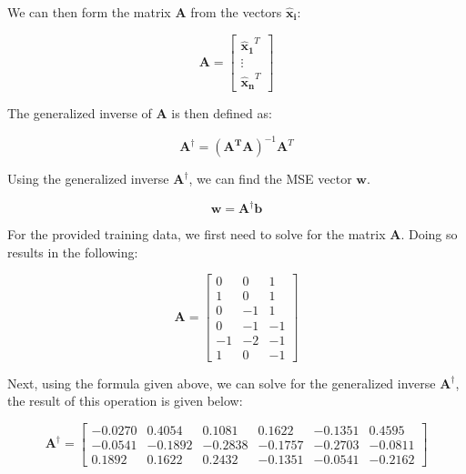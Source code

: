 \documentclass[fleqn]{article}
\begin{document}
\begin{enumerate}
		We can then form the matrix $\mathbf{A}$ from the vectors $\mathbf{\hat{x}_i}$:
		
		\begin{equation*}
			\mathbf{A} = \begin{bmatrix} \mathbf{\hat{x}_1}^T \\ \vdots \\ \mathbf{\hat{x}_n}^T \end{bmatrix}					
		\end{equation*}
		
		The generalized inverse of $\mathbf{A}$ is then defined as:
		
		\begin{equation*}
			\mathbf{A}^{\dag} = (\mathbf{A^T}\mathbf{A})^{-1}\mathbf{A}^T
		\end{equation*}
		
		Using the generalized inverse $\mathbf{A}^{\dag}$, we can find the MSE vector $\mathbf{w}$.
		
		\begin{equation*}
			\mathbf{w} = \mathbf{A}^{\dag}\mathbf{b}
		\end{equation*}
			
		For the provided training data, we first need to solve for the matrix $\mathbf{A}$. Doing so results in the following:
		
		\begin{equation*}
			\mathbf{A} = \begin{bmatrix}
				0  &  0 &  1 \\
				1  &  0 &  1 \\
				0  & -1 &  1 \\
				0  & -1 & -1 \\
			   -1  & -2 & -1 \\
			    1  &  0 & -1
			\end{bmatrix}
		\end{equation*}
		
		Next, using the formula given above, we can solve for the generalized inverse $\mathbf{A}^{\dag}$, the result of this operation is given below:
		
		\begin{equation*}
			\mathbf{A}^{\dag} = \begin{bmatrix} 
			   -0.0270 &  0.4054 &  0.1081 &  0.1622 & -0.1351 &  0.4595 \\
			   -0.0541 & -0.1892 & -0.2838 & -0.1757 & -0.2703 & -0.0811 \\
			    0.1892 &  0.1622 &  0.2432 & -0.1351 & -0.0541 & -0.2162
			\end{bmatrix}
		\end{equation*}
		

\end{enumerate}
\end{document}

